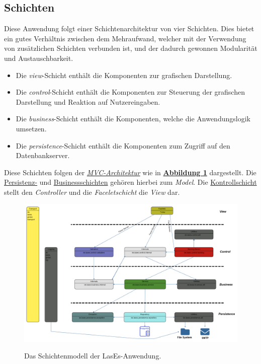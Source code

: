 
\subsection{Schichten}\label{arch:schichten}
Diese Anwendung folgt einer Schichtenarchitektur von vier Schichten. Dies bietet ein gutes Verhältnis zwischen dem Mehraufwand,
welcher mit der Verwendung von zusätzlichen Schichten verbunden ist, und der dadurch gewonnen Modularität und Austauschbarkeit.
\begin{itemize}
    \item Die \emph{view}-Schicht enthält die Komponenten zur grafischen Darstellung.
    \item Die \emph{control}-Schicht enthält die Komponenten zur Steuerung der grafischen Darstellung und Reaktion auf
    Nutzereingaben.
    \item Die \emph{business}-Schicht enthält die Komponenten, welche die Anwendungslogik umsetzen.
    \item Die \emph{persistence}-Schicht enthält die Komponenten zum Zugriff auf den Datenbankserver.
\end{itemize}
Diese Schichten folgen der \emph{\hyperref[arch:mvc]{MVC-Architektur}} wie in \textbf{\hyperref[arch:pakdia]{Abbildung 1}} dargestellt.
Die \hyperref[arch:persistence]{Persistenz-} und \hyperref[arch:business]{Businessschichten} gehören hierbei
zum \emph{Model}. Die \hyperref[arch:control]{Kontrollschicht} stellt den \emph{Controller} und die
\emph{Faceletschicht} %
die \emph{View} dar.

\begin{figure}[H]
\centering
    \includegraphics[width=0.8\linewidth]{graphics/Paketdiagramm8.0}\label{arch:pakdia}
    \caption{Das Schichtenmodell der LasEs-Anwendung.}
\end{figure}



